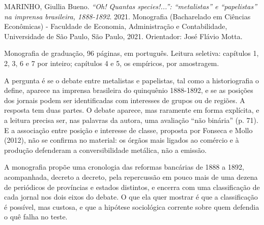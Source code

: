 
\begin{identificacao}
MARINHO, Giullia Bueno. \emph{``Oh! Quantas species!...'': ``metalistas'' e
``papelistas'' na imprensa brasileira, 1888-1892}. 2021. Monografia
(Bacharelado em Ciências Econômicas) - Faculdade de Economia, Administração e
Contabilidade, Universidade de São Paulo, São Paulo, 2021. Orientador: José
Flávio Motta.

Monografia de graduação, 96 páginas, em português. Leitura seletiva: capítulos
1, 2, 3, 6 e 7 por inteiro; capítulos 4 e 5, os empíricos, por amostragem.
\end{identificacao}

A pergunta é se o debate entre metalistas e papelistas, tal como a
historiografia o define, aparece na imprensa brasileira do quinquênio
1888-1892, e se as posições dos jornais podem ser identificadas com interesses
de grupos ou de regiões. A resposta tem duas partes. O debate aparece, mas
raramente em forma explícita, e a leitura precisa ser, nas palavras da autora,
uma avaliação ``não binária'' (p. 71). E a associação entre posição e interesse
de classe, proposta por Fonseca e Mollo (2012), não se confirma no material:
os órgãos mais ligados ao comércio e à produção defenderam a conversibilidade
metálica, não a emissão.

A monografia propõe uma cronologia das reformas bancárias de 1888 a 1892,
acompanhada, decreto a decreto, pela repercussão em pouco mais de uma dezena
de periódicos de províncias e estados distintos, e encerra com uma
classificação de cada jornal nos dois eixos do debate. O que ela quer mostrar
é que a classificação é possível, mas custosa, e que a hipótese sociológica
corrente sobre quem defendia o quê falha no teste.

